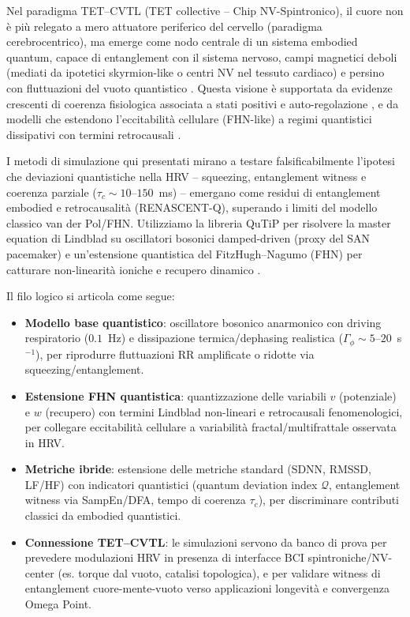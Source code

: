 \documentclass[11pt,a4paper]{article}
\let\oldcite\cite
\renewcommand{\cite}{\protect\oldcite}
\theoremstyle{plain}
\theoremstyle{definition}
\begin{document}
\vspace{0.2cm}

Nel paradigma TET--CVTL (TET collective – Chip NV-Spintronico), il cuore non è più relegato a mero attuatore periferico del cervello (paradigma cerebrocentrico), ma emerge come nodo centrale di un sistema embodied quantum, capace di entanglement con il sistema nervoso, campi magnetici deboli (mediati da ipotetici skyrmion-like o centri NV nel tessuto cardiaco) e persino con fluttuazioni del vuoto quantistico \cite{HeartQuantumCoherence2024}. Questa visione è supportata da evidenze crescenti di coerenza fisiologica associata a stati positivi e auto-regolazione \cite{McCraty2017}, e da modelli che estendono l'eccitabilità cellulare (FHN-like) a regimi quantistici dissipativi con termini retrocausali \cite{Ghose2025}.

\vspace{0.2cm}

I metodi di simulazione qui presentati mirano a testare falsificabilmente l'ipotesi che deviazioni quantistiche nella HRV -- squeezing, entanglement witness e coerenza parziale ($\tau_c \sim 10$--$150$~ms) -- emergano come residui di entanglement embodied e retrocausalità (RENASCENT-Q), superando i limiti del modello classico van der Pol/FHN. Utilizziamo la libreria QuTiP per risolvere la master equation di Lindblad su oscillatori bosonici damped-driven (proxy del SAN pacemaker) e un'estensione quantistica del FitzHugh--Nagumo (FHN) per catturare non-linearità ioniche e recupero dinamico \cite{Johansson2012qutip,FitzHugh1961}.

Il filo logico si articola come segue:
\begin{itemize}
    \item \textbf{Modello base quantistico}: oscillatore bosonico anarmonico con driving respiratorio ($0.1$~Hz) e dissipazione termica/dephasing realistica ($\Gamma_\phi \sim 5$--$20$~s$^{-1}$), per riprodurre fluttuazioni RR amplificate o ridotte via squeezing/entanglement.
    \item \textbf{Estensione FHN quantistica}: quantizzazione delle variabili $v$ (potenziale) e $w$ (recupero) con termini Lindblad non-lineari e retrocausali fenomenologici, per collegare eccitabilità cellulare a variabilità fractal/multifrattale osservata in HRV.
    \item \textbf{Metriche ibride}: estensione delle metriche standard (SDNN, RMSSD, LF/HF) con indicatori quantistici (quantum deviation index $\mathcal{Q}$, entanglement witness via SampEn/DFA, tempo di coerenza $\tau_c$), per discriminare contributi classici da embodied quantistici.
    \item \textbf{Connessione TET--CVTL}: le simulazioni servono da banco di prova per prevedere modulazioni HRV in presenza di interfacce BCI spintroniche/NV-center (es. torque dal vuoto, catalisi topologica), e per validare witness di entanglement cuore-mente-vuoto verso applicazioni longevità e convergenza Omega Point.
\end{itemize}
\end{document}
